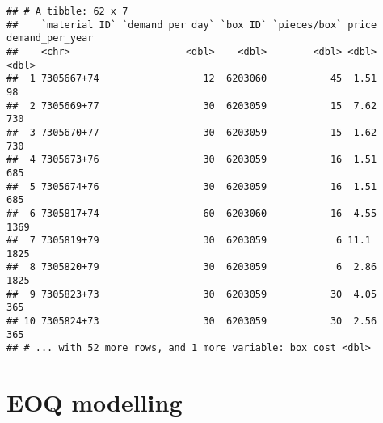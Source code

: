 \documentclass[
]{article}
\newenvironment{Shaded}{\begin{snugshade}}{\end{snugshade}}
\newcommand{\CommentTok}[1]{\textcolor[rgb]{0.56,0.35,0.01}{\textit{#1}}}
\newcommand{\DataTypeTok}[1]{\textcolor[rgb]{0.13,0.29,0.53}{#1}}
\newcommand{\DecValTok}[1]{\textcolor[rgb]{0.00,0.00,0.81}{#1}}
\newcommand{\KeywordTok}[1]{\textcolor[rgb]{0.13,0.29,0.53}{\textbf{#1}}}
\newcommand{\NormalTok}[1]{#1}
\newcommand{\StringTok}[1]{\textcolor[rgb]{0.31,0.60,0.02}{#1}}
\begin{document}
\begin{verbatim}
## # A tibble: 62 x 7
##    `material ID` `demand per day` `box ID` `pieces/box` price demand_per_year
##    <chr>                    <dbl>    <dbl>        <dbl> <dbl>           <dbl>
##  1 7305667+74                  12  6203060           45  1.51              98
##  2 7305669+77                  30  6203059           15  7.62             730
##  3 7305670+77                  30  6203059           15  1.62             730
##  4 7305673+76                  30  6203059           16  1.51             685
##  5 7305674+76                  30  6203059           16  1.51             685
##  6 7305817+74                  60  6203060           16  4.55            1369
##  7 7305819+79                  30  6203059            6 11.1             1825
##  8 7305820+79                  30  6203059            6  2.86            1825
##  9 7305823+73                  30  6203059           30  4.05             365
## 10 7305824+73                  30  6203059           30  2.56             365
## # ... with 52 more rows, and 1 more variable: box_cost <dbl>
\end{verbatim}

\begin{Shaded}
\end{Shaded}

\hypertarget{eoq-modelling}{%
\section{EOQ modelling}\label{eoq-modelling}}
\end{document}
